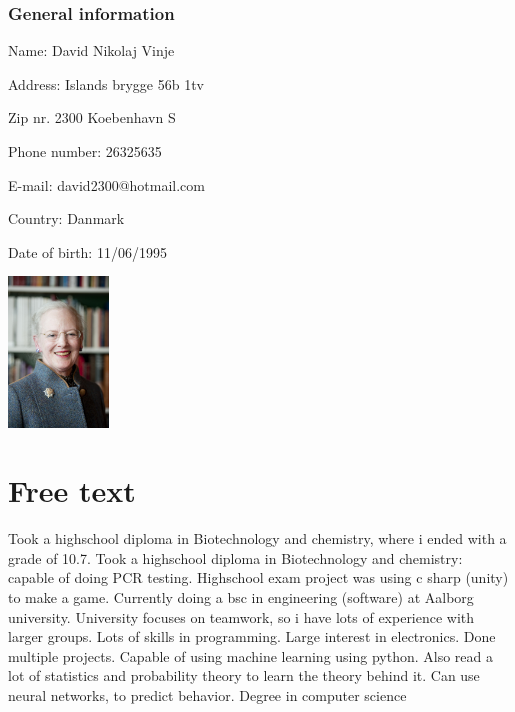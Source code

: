 \begin{minipage}[b]{0.45\textwidth} 
\subsubsection*{General information}
 Name: David Nikolaj Vinje 

 Address: Islands brygge 56b 1tv 

 Zip nr. 2300 Koebenhavn S 

 Phone number: 26325635 

 E-mail: david2300@hotmail.com 

 Country: Danmark 

 Date of birth: 11/06/1995 
 \end{minipage}
 \hfill
\begin{minipage}[b]{3cm} \includegraphics[height=4cm]{figures/1200px-Drottning_Margrethe_av_Danmark} \end{minipage}

\section*{Free text}
Took a highschool diploma in Biotechnology and chemistry, where i ended with a grade of 10.7.
Took a highschool diploma in Biotechnology and chemistry: capable of doing PCR testing.
Highschool exam project was using c sharp (unity) to make a game.
Currently doing a bsc in engineering (software) at Aalborg university.
University focuses on teamwork, so i have lots of experience with larger groups.
Lots of skills in programming.
Large interest in electronics. Done multiple projects.
Capable of using machine learning using python. Also read a lot of statistics and probability theory to learn the theory behind it. Can use neural networks, to predict behavior.
Degree in computer science


